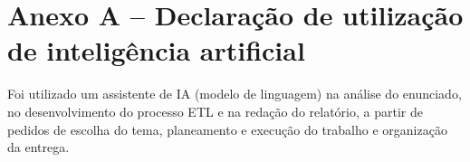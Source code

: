 \documentclass[11pt,a4paper]{article}
\begin{document}
\section*{Anexo A -- Declaração de utilização de inteligência artificial}

Foi utilizado um assistente de IA (modelo de linguagem) na análise do enunciado, no desenvolvimento do processo ETL e na redação do relatório, a partir de pedidos de escolha do tema, planeamento e execução do trabalho e organização da entrega.
\end{document}

